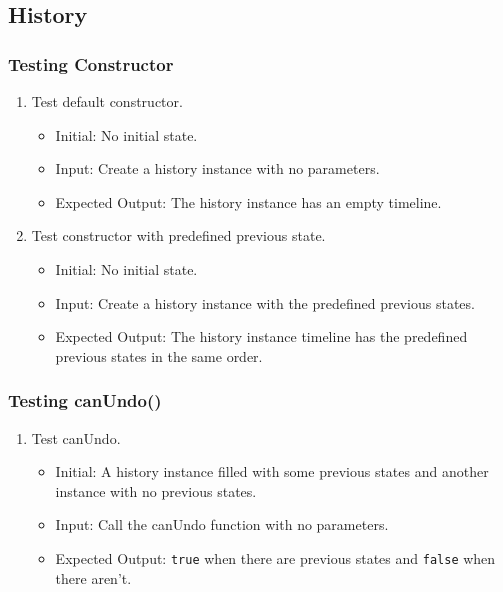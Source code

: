 \documentclass[12pt, titlepage]{article}
\begin{document}
\subsection {History}
\subsubsection {Testing Constructor}
\begin{enumerate}
	\item Test default constructor. \begin{itemize}
		      \item Initial: No initial state.
		      \item Input: Create a history instance with no parameters.
		      \item Expected Output: The history instance has an empty timeline.
	      \end{itemize}
		\item Test constructor with predefined previous state.\begin{itemize}
				\item Initial: No initial state.
				\item Input: Create a history instance with the predefined previous states.
				\item Expected Output: The history instance timeline has the predefined previous states in the same order.
			\end{itemize}
\end{enumerate}

\subsubsection {Testing canUndo()}
\begin{enumerate}
	\item Test canUndo. \begin{itemize}
		      \item Initial: A history instance filled with some previous states and another instance with no previous states.
		      \item Input: Call the canUndo function with no parameters.
		      \item Expected Output: \texttt{true} when there are previous states and \texttt{false} when there aren't.
	      \end{itemize}
\end{enumerate}
\end{document}
